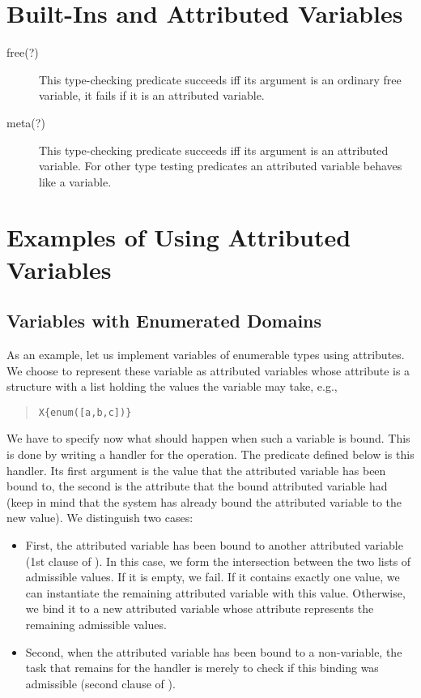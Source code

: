 \section{Built-Ins and Attributed Variables}
\begin{description}
\item[free(?)]
This type-checking predicate succeeds iff its argument is an
ordinary free variable, it fails if it is an attributed variable.

\item[meta(?)]
This type-checking predicate succeeds iff its argument is an attributed
variable.
For other type testing predicates an attributed variable behaves like a
variable.
\end{description}

\section{Examples of Using Attributed Variables}
\subsection{Variables with Enumerated Domains}
As an example, let us implement variables of enumerable types
using attributes.
We choose to represent these variable as attributed variables
whose attribute is
a  structure with a list holding the values the variable may
take, e.g.,
\begin{quote}
\begin{verbatim}
X{enum([a,b,c])}
\end{verbatim}
\end{quote}

We have to specify now what should happen when such a variable is
bound. This is done by writing a handler for the  operation.
The predicate  defined below is this
handler.
Its first argument is the value that the attributed variable has been bound to,
the second is the attribute that the bound attributed variable had
(keep in mind that the system has already bound the attributed variable to the
new value).  We distinguish two cases:
\begin{itemize}
\item
First, the attributed variable has been
bound to another attributed variable (1st clause of ).
In this case, we form the intersection between the two lists
of admissible values. If it is empty, we fail.
If it contains exactly one value, we can instantiate the remaining
attributed variable with this value.
Otherwise, we bind it to a new attributed variable whose attribute represents
the remaining admissible values.

\item
Second, when the attributed variable has been bound to a non-variable, the
task that remains for the handler is merely to check if this binding
was admissible (second clause of ).
\end{itemize}

